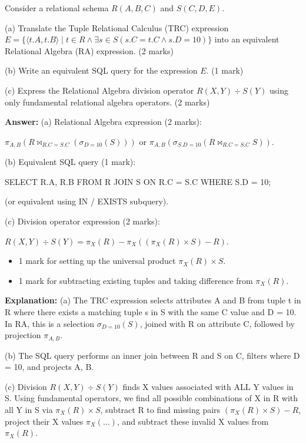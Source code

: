 \begin{tcolorbox}[enhanced,breakable,colback=boxgray,colframe=gray!45,boxrule=0.4pt,arc=2pt,left=6pt,right=6pt,top=4pt,bottom=4pt,title={Q.7},fonttitle=\bfseries\small,coltitle=black,colbacktitle=gray!15]
\small Consider a relational schema $R(A, B, C)$ and $S(C, D, E)$.\par
(a) Translate the Tuple Relational Calculus (TRC) expression $E = \{ \langle t.A, t.B \rangle \mid t \in R \land \exists s \in S (s.C = t.C \land s.D = 10) \}$ into an equivalent Relational Algebra (RA) expression. (2 marks)\par
(b) Write an equivalent SQL query for the expression $E$. (1 mark)\par
(c) Express the Relational Algebra division operator $R(X, Y) \div S(Y)$ using only fundamental relational algebra operators. (2 marks)\par\par{}\par\smallskip\textbf{Answer:} (a) Relational Algebra expression (2 marks):\par
$\pi_{A, B}(R \bowtie_{R.C = S.C} (\sigma_{D = 10}(S)))$ or $\pi_{A, B}(\sigma_{S.D = 10}(R \bowtie_{R.C = S.C} S))$.\par
(b) Equivalent SQL query (1 mark):\par
SELECT R.A, R.B FROM R JOIN S ON R.C = S.C WHERE S.D = 10;\par
(or equivalent using IN / EXISTS subquery).\par
(c) Division operator expression (2 marks):\par
$R(X, Y) \div S(Y) = \pi_X(R) - \pi_X((\pi_X(R) \times S) - R)$.\par
\begin{itemize}[leftmargin=1.4em,itemsep=1pt]
\item 1 mark for setting up the universal product $\pi_X(R) \times S$.
\item 1 mark for subtracting existing tuples and taking difference from $\pi_X(R)$.
\end{itemize}\par\textbf{Explanation:} (a) The TRC expression selects attributes A and B from tuple t in R where there exists a matching tuple s in S with the same C value and D = 10. In RA, this is a selection $\sigma_{D=10}(S)$, joined with R on attribute C, followed by projection $\pi_{A,B}$.\par
(b) The SQL query performs an inner join between R and S on C, filters where D = 10, and projects A, B.\par
(c) Division $R(X,Y) \div S(Y)$ finds X values associated with ALL Y values in S. Using fundamental operators, we find all possible combinations of X in R with all Y in S via $\pi_X(R) \times S$, subtract R to find missing pairs $(\pi_X(R) \times S) - R$, project their X values $\pi_X(...)$, and subtract these invalid X values from $\pi_X(R)$.\par
\end{tcolorbox}


